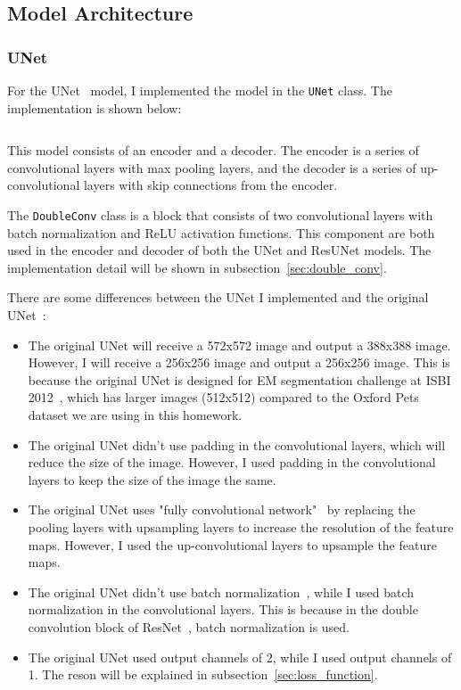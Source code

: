 \subsection{Model Architecture}

\subsubsection{UNet}
\label{sec:unet}

For the UNet~\cite{UNet} model, I implemented the model in the \texttt{UNet} class. The implementation is shown below:

\inputminted[firstline=7]{python}{../src/models/unet.py}

This model consists of an encoder and a decoder. The encoder is a series of convolutional layers with max pooling layers, and the decoder is a series of up-convolutional layers with skip connections from the encoder.

The \texttt{DoubleConv} class is a block that consists of two convolutional layers with batch normalization and ReLU activation functions.
This component are both used in the encoder and decoder of both the UNet and ResUNet models.
The implementation detail will be shown in subsection~\ref{sec:double_conv}.

There are some differences between the UNet I implemented and the original UNet~\cite{UNet}:
\begin{itemize}
    \item The original UNet will receive a 572x572 image and output a 388x388 image. However, I will receive a 256x256 image and output a 256x256 image.
          This is because the original UNet is designed for EM segmentation challenge at ISBI 2012~\cite{ISBI2012EM}, which has larger images (512x512) compared to the Oxford Pets dataset we are using in this homework.
    \item The original UNet didn't use padding in the convolutional layers, which will reduce the size of the image.
          However, I used padding in the convolutional layers to keep the size of the image the same.
    \item The original UNet uses "fully convolutional network"~\cite{FCN} by replacing the pooling layers with upsampling layers to increase the resolution of the feature maps.
          However, I used the up-convolutional layers to upsample the feature maps.
    \item The original UNet didn't use batch normalization~\cite{BN}, while I used batch normalization in the convolutional layers.
          This is because in the double convolution block of ResNet~\cite{ResNet}, batch normalization is used.
    \item The original UNet used output channels of 2, while I used output channels of 1. The reson will be explained in subsection~\ref{sec:loss_function}.
\end{itemize}

